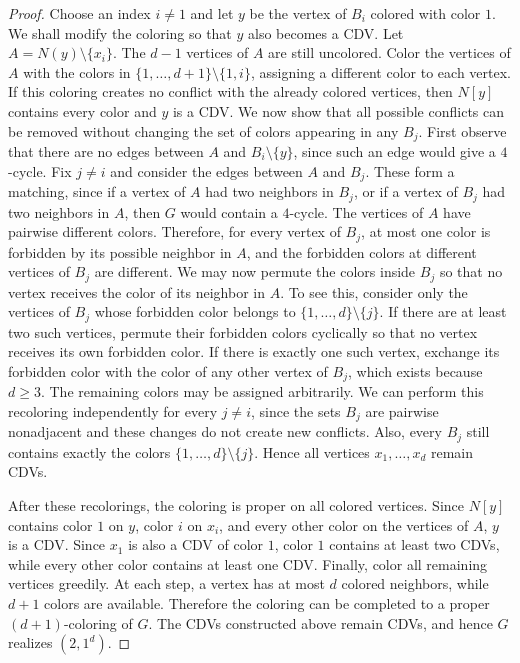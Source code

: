 \documentclass{article}
\theoremstyle{definition}
\begin{document}
\begin{proof}
Choose an index $i\neq 1$ and let $y$ be the vertex of $B_i$ colored with color $1$. We shall modify the coloring so that $y$ also becomes a CDV. Let $A=N(y)\setminus\{x_i\}$. The $d-1$ vertices of $A$ are still uncolored. Color the vertices of $A$ with the colors in $\{1,\ldots,d+1\}\setminus\{1,i\}$, assigning a different color to each vertex. If this coloring creates no conflict with the already colored vertices, then $N[y]$ contains every color and $y$ is a CDV. We now show that all possible conflicts can be removed without changing the set of colors appearing in any $B_j$. First observe that there are no edges between $A$ and $B_i\setminus\{y\}$, since such an edge would give a $4$-cycle. Fix $j\neq i$ and consider the edges between $A$ and $B_j$. These form a matching, since if a vertex of $A$ had two neighbors in $B_j$, or if a vertex of $B_j$ had two neighbors in $A$, then $G$ would contain a $4$-cycle. The vertices of $A$ have pairwise different colors. Therefore, for every vertex of $B_j$, at most one color is forbidden by its possible neighbor in $A$, and the forbidden colors at different vertices of $B_j$ are different. We may now permute the colors inside $B_j$ so that no vertex receives the color of its neighbor in $A$. To see this, consider only the vertices of $B_j$ whose forbidden color belongs to $\{1,\ldots,d\}\setminus\{j\}$. If there are at least two such vertices, permute their forbidden colors cyclically so that no vertex receives its own forbidden color. If there is exactly one such vertex, exchange its forbidden color with the color of any other vertex of $B_j$, which exists because $d\geq 3$. The remaining colors may be assigned arbitrarily. We can perform this recoloring independently for every $j\neq i$, since the sets $B_j$ are pairwise nonadjacent and these changes do not create new conflicts. Also, every $B_j$ still contains exactly the colors $\{1,\ldots,d\}\setminus\{j\}$. Hence all vertices $x_1,\ldots,x_d$ remain CDVs.

After these recolorings, the coloring is proper on all colored vertices. Since $N[y]$ contains color $1$ on $y$, color $i$ on $x_i$, and every other color on the vertices of $A$, $y$ is a CDV. Since $x_1$ is also a CDV of color $1$, color $1$ contains at least two CDVs, while every other color contains at least one CDV. Finally, color all remaining vertices greedily. At each step, a vertex has at most $d$ colored neighbors, while $d+1$ colors are available. Therefore the coloring can be completed to a proper $(d+1)$-coloring of $G$. The CDVs constructed above remain CDVs, and hence $G$ realizes $(2,1^d)$.
\end{proof}
\end{document}

